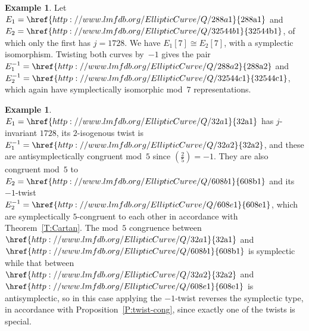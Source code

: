 \documentclass[12pt, reqno]{amsart}
\newcommand{\lmfdbec}[3]{\href{http://www.lmfdb.org/EllipticCurve/Q/#1#2#3}{{\text{\rm#1#2#3}}}}
\def\legendre#1#2{\left(\displaystyle\frac{#1}{#2}\right)}
\numberwithin{equation}{section}
\theoremstyle{definition}
\newtheorem{example}[theorem]{Example}
\theoremstyle{remark}
\begin{document}
\begin{example}
Let $E_1=\lmfdbec{288}{a}{1}$ and $E_2=\lmfdbec{32544}{b}{1}$, of
which only the first has $j=1728$.  We have $E_1[7]\cong E_2[7]$, with
a symplectic isomorphism.  Twisting both curves by~$-1$ gives the pair
$E_1^{-1}=\lmfdbec{288}{a}{2}$ and $E_2^{-1}=\lmfdbec{32544}{c}{1}$,
which again have symplectically isomorphic mod~$7$ representations.
\end{example}

\begin{example}
  $E_1=\lmfdbec{32}{a}{1}$ has $j$-invariant $1728$, its $2$-isogenous
  twist is $E_1^{-1}=\lmfdbec{32}{a}{2}$, and these are
  antisymplectically congruent mod~$5$ since $\legendre{2}{5}=-1$.
  They are also congruent mod~$5$ to $E_2=\lmfdbec{608}{b}{1}$ and its
  $-1$-twist $E_2^{-1}=\lmfdbec{608}{e}{1}$, which are symplectically
  $5$-congruent to each other in accordance with
  Theorem~\ref{T:Cartan}.  The mod~$5$ congruence between
  $\lmfdbec{32}{a}{1}$ and $\lmfdbec{608}{b}{1}$ is symplectic while
  that between $\lmfdbec{32}{a}{2}$ and $\lmfdbec{608}{e}{1}$ is
  antisymplectic, so in this case applying the $-1$-twist reverses the
  symplectic type, in accordance with Proposition~\ref{P:twist-cong},
  since exactly one of the twists is special.
\end{example}
\end{document}

